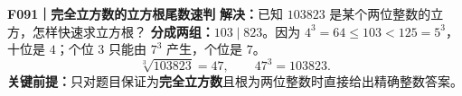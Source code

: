 \textbf{F091｜完全立方数的立方根尾数速判}
\textbf{解决：}已知 $103823$ 是某个两位整数的立方，怎样快速求立方根？
\textbf{分成两组：}$103\mid823$。因为 $4^3=64\le103<125=5^3$，十位是 $4$；个位 $3$ 只能由 $7^3$ 产生，个位是 $7$。
\[\boxed{\sqrt[3]{103823}=47},\qquad47^3=103823.\]
\textbf{关键前提：}只对题目保证为\textbf{完全立方数}且根为两位整数时直接给出精确整数答案。
